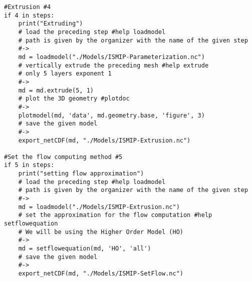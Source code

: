 \begin{lstlisting}
#Extrusion #4
if 4 in steps:
    print("Extruding")
    # load the preceding step #help loadmodel
    # path is given by the organizer with the name of the given step
    #->
    md = loadmodel("./Models/ISMIP-Parameterization.nc")
    # vertically extrude the preceding mesh #help extrude
    # only 5 layers exponent 1
    #->
    md = md.extrude(5, 1)
    # plot the 3D geometry #plotdoc
    #->
    plotmodel(md, 'data', md.geometry.base, 'figure', 3)
    # save the given model
    #->
    export_netCDF(md, "./Models/ISMIP-Extrusion.nc")

#Set the flow computing method #5
if 5 in steps:
    print("setting flow approximation")
    # load the preceding step #help loadmodel
    # path is given by the organizer with the name of the given step
    #->
    md = loadmodel("./Models/ISMIP-Extrusion.nc")
    # set the approximation for the flow computation #help setflowequation
    # We will be using the Higher Order Model (HO)
    #->
    md = setflowequation(md, 'HO', 'all')
    # save the given model
    #->
    export_netCDF(md, "./Models/ISMIP-SetFlow.nc")


\end{lstlisting}

